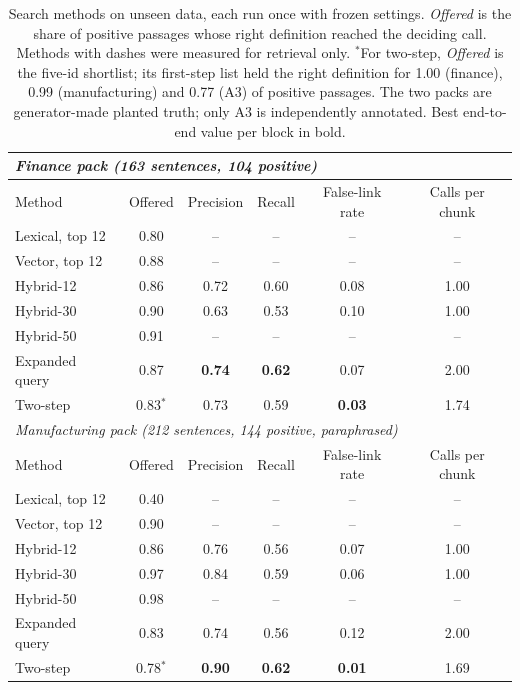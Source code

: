 \begin{table}[H]
\centering\small
\caption{Search methods on unseen data, each run once with frozen settings. \emph{Offered} is the share of positive passages whose right definition reached the deciding call. Methods with dashes were measured for retrieval only. $^{\ast}$For two-step, \emph{Offered} is the five-id shortlist; its first-step list held the right definition for 1.00 (finance), 0.99 (manufacturing) and 0.77 (A3) of positive passages. The two packs are generator-made planted truth; only A3 is independently annotated. Best end-to-end value per block in bold.}
\label{tab:search-unseen}
\begin{tabular}{lccccc}
\toprule
\multicolumn{6}{l}{\textit{Finance pack (163 sentences, 104 positive)}}\\\midrule
Method & Offered & Precision & Recall & False-link rate & Calls per chunk\\\midrule
Lexical, top 12 & 0.80 & -- & -- & -- & --\\
Vector, top 12 & 0.88 & -- & -- & -- & --\\
Hybrid-12 & 0.86 & 0.72 & 0.60 & 0.08 & 1.00\\
Hybrid-30 & 0.90 & 0.63 & 0.53 & 0.10 & 1.00\\
Hybrid-50 & 0.91 & -- & -- & -- & --\\
Expanded query & 0.87 & \textbf{0.74} & \textbf{0.62} & 0.07 & 2.00\\
Two-step & 0.83$^{\ast}$ & 0.73 & 0.59 & \textbf{0.03} & 1.74\\
\midrule
\multicolumn{6}{l}{\textit{Manufacturing pack (212 sentences, 144 positive, paraphrased)}}\\\midrule
Method & Offered & Precision & Recall & False-link rate & Calls per chunk\\\midrule
Lexical, top 12 & 0.40 & -- & -- & -- & --\\
Vector, top 12 & 0.90 & -- & -- & -- & --\\
Hybrid-12 & 0.86 & 0.76 & 0.56 & 0.07 & 1.00\\
Hybrid-30 & 0.97 & 0.84 & 0.59 & 0.06 & 1.00\\
Hybrid-50 & 0.98 & -- & -- & -- & --\\
Expanded query & 0.83 & 0.74 & 0.56 & 0.12 & 2.00\\
Two-step & 0.78$^{\ast}$ & \textbf{0.90} & \textbf{0.62} & \textbf{0.01} & 1.69\\
\midrule

\end{tabular}
\end{table}

